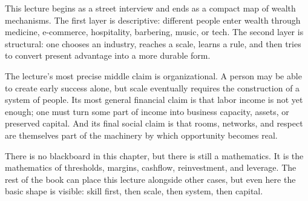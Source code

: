 This lecture begins as a street interview and ends as a compact map of wealth mechanisms. The first layer is descriptive: different people enter wealth through medicine, e-commerce, hospitality, barbering, music, or tech. The second layer is structural: one chooses an industry, reaches a scale, learns a rule, and then tries to convert present advantage into a more durable form.

The lecture's most precise middle claim is organizational. A person may be able to create early success alone, but scale eventually requires the construction of a system of people. Its most general financial claim is that labor income is not yet enough; one must turn some part of income into business capacity, assets, or preserved capital. And its final social claim is that rooms, networks, and respect are themselves part of the machinery by which opportunity becomes real.

There is no blackboard in this chapter, but there is still a mathematics. It is the mathematics of thresholds, margins, cashflow, reinvestment, and leverage. The rest of the book can place this lecture alongside other cases, but even here the basic shape is visible: skill first, then scale, then system, then capital.